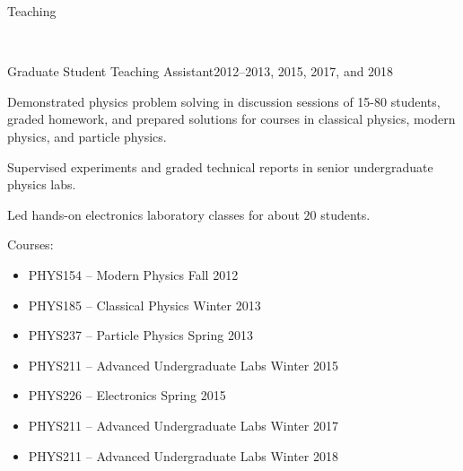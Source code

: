 \documentclass{resume}
\begin{document}
\begin{rsection}{Teaching}

  \\[0.5em]
  \begin{rsubsubsection}{Graduate Student Teaching Assistant}{2012--2013, 2015, 2017, and 2018}
  \item Demonstrated physics problem solving in discussion sessions of 15-80 students, graded homework, and prepared solutions for courses in classical physics, modern physics, and particle physics.
  \item Supervised experiments and graded technical reports in senior undergraduate physics labs.
  \item Led hands-on electronics laboratory classes for about $20$ students.
  \item Courses: \vspace{-0.1cm}
    \begin{itemize}
      \item PHYS154 -- Modern Physics \hfill Fall 2012 \vspace{-0.2cm}
      \item PHYS185 -- Classical Physics \hfill Winter 2013 \vspace{-0.2cm}
      \item PHYS237 -- Particle Physics \hfill Spring 2013 \vspace{-0.2cm}
      \item PHYS211 -- Advanced Undergraduate Labs \hfill Winter 2015 \vspace{-0.2cm}
      \item PHYS226 -- Electronics \hfill Spring 2015 \vspace{-0.2cm}
      \item PHYS211 -- Advanced Undergraduate Labs \hfill Winter 2017 \vspace{-0.2cm}
      \item PHYS211 -- Advanced Undergraduate Labs \hfill Winter 2018 \vspace{-0.2cm}
    \end{itemize}
  \end{rsubsubsection}

\end{rsection}

\end{document}
